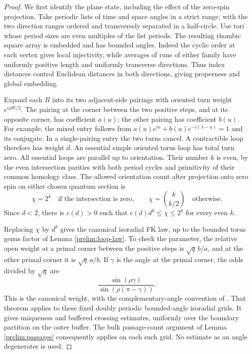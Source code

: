 \begin{proof}
We first identify the plane state, including the effect of the
zero-spin projection. Take periodic lists of time and space angles
in a strict range, with the two direction ranges ordered and
transversely separated in a half-circle. Use tori whose period
sizes are even multiples of the list periods. The resulting
rhombic square array is embedded and has bounded angles. Indeed
the cyclic order at each vertex gives local injectivity, while
averages of runs of either family have uniformly positive length
and uniformly transverse directions. Thus index distances control
Euclidean distances in both directions, giving properness and
global embedding.

Expand each $R$ into its two adjacent-side pairings with oriented
turn weight $e^{i\rho W/2}$. The pairing at the corner between the
two positive steps, and at its opposite corner, has coefficient
$a(u)$; the other pairing has coefficient $b(u)$. For example, the
mixed entry follows from
$a(u)e^{iu}+b(u)e^{-i(\lambda-u)}=1$ and its conjugate. In a
single-pairing entry the two turns cancel. A contractible loop
therefore has weight $d$. An essential simple oriented torus loop
has total turn zero. All essential loops are parallel up to
orientation. Their number $k$ is even, by the even intersection
parities with both period cycles and primitivity of their common
homology class. The allowed orientation count after projection
onto zero spin on either chosen quantum section is
\begin{equation}\label{bulk:essential-count}
 \chi=2^k\quad\text{if the intersection is zero},\qquad
 \chi=\binom{k}{k/2}\quad\text{otherwise}.
\end{equation}
Since $d<2$, there is $c(d)>0$ such that
$c(d)d^k\le\chi\le2^k$ for every even $k$.

Replacing $\chi$ by $d^k$ gives the canonical isoradial FK law,
up to the bounded torus genus factor of Lemma
\ref{prelim:loop-law}. To check the parameter, the relative
open weight at a primal corner between the positive steps is
$\sqrt q\,b/a$, and at the other primal corner it is
$\sqrt q\,a/b$. If $\gamma$ is the angle at the primal corner, the
odds divided by $\sqrt q$ are
\[
 \frac{\sin(\rho\gamma)}{\sin(\rho(\pi-\gamma))}.
\]
This is the canonical weight, with the complementary-angle
convention of \cite[Theorem 1.1]{DCLM2019Isoradial}. That theorem applies
to these fixed doubly periodic bounded-angle isoradial grids. It
gives uniqueness and buffered crossing estimates, uniformly over
the boundary partition on the outer buffer. The bulk passage-count
argument of Lemma \ref{prelim:passages} consequently applies
on each such grid. No estimate as an angle degenerates is used.


\end{proof}
